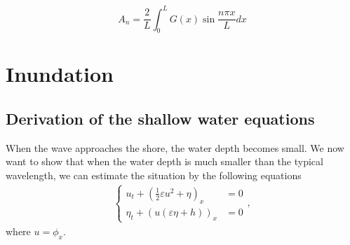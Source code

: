 \documentclass[11pt]{article}
\begin{document}
\begin{equation}
A_n = \frac{2}{L} \int_0^L G(x) \sin \frac{n \pi x}{L} d x
\end{equation}
%
%


\section{Inundation}

%


%

\subsection{Derivation of the shallow water equations}
When the wave approaches the shore, the water depth becomes small. We now want to show that when the water depth is much smaller than the typical wavelength, we can estimate the situation by the following equations 
\begin{align}
    \label{eq:shallow}
    \begin{cases}
	    u_t + \left(\frac{1}{2}\varepsilon u^2 + \eta\right)_x & = 0 \\
	    \eta_t + (u(\varepsilon\eta + h))_x & = 0
	\end{cases},
\end{align}
where $u = \phi_x$. 
\end{document}
